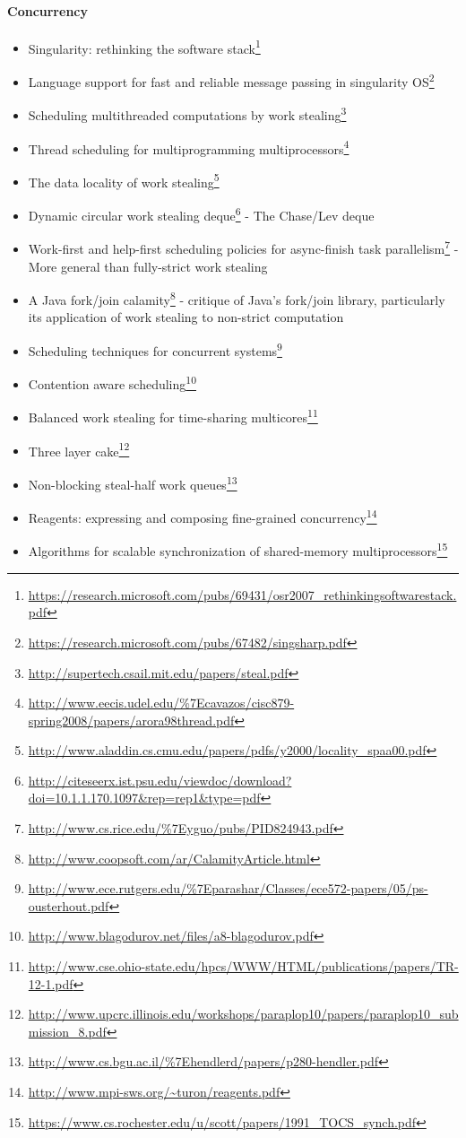 \documentclass[a4paper,]{book}
\renewcommand{\href}[2]{#2\footnote{\url{#1}}}
\begin{document}
\paragraph{Concurrency}\label{concurrency}

\begin{itemize}
\itemsep1pt\parskip0pt
\item
  \href{https://research.microsoft.com/pubs/69431/osr2007_rethinkingsoftwarestack.pdf}{Singularity:
  rethinking the software stack}
\item
  \href{https://research.microsoft.com/pubs/67482/singsharp.pdf}{Language
  support for fast and reliable message passing in singularity OS}
\item
  \href{http://supertech.csail.mit.edu/papers/steal.pdf}{Scheduling
  multithreaded computations by work stealing}
\item
  \href{http://www.eecis.udel.edu/\%7Ecavazos/cisc879-spring2008/papers/arora98thread.pdf}{Thread
  scheduling for multiprogramming multiprocessors}
\item
  \href{http://www.aladdin.cs.cmu.edu/papers/pdfs/y2000/locality_spaa00.pdf}{The
  data locality of work stealing}
\item
  \href{http://citeseerx.ist.psu.edu/viewdoc/download?doi=10.1.1.170.1097\&rep=rep1\&type=pdf}{Dynamic
  circular work stealing deque} - The Chase/Lev deque
\item
  \href{http://www.cs.rice.edu/\%7Eyguo/pubs/PID824943.pdf}{Work-first
  and help-first scheduling policies for async-finish task parallelism}
  - More general than fully-strict work stealing
\item
  \href{http://www.coopsoft.com/ar/CalamityArticle.html}{A Java
  fork/join calamity} - critique of Java's fork/join library,
  particularly its application of work stealing to non-strict
  computation
\item
  \href{http://www.ece.rutgers.edu/\%7Eparashar/Classes/ece572-papers/05/ps-ousterhout.pdf}{Scheduling
  techniques for concurrent systems}
\item
  \href{http://www.blagodurov.net/files/a8-blagodurov.pdf}{Contention
  aware scheduling}
\item
  \href{http://www.cse.ohio-state.edu/hpcs/WWW/HTML/publications/papers/TR-12-1.pdf}{Balanced
  work stealing for time-sharing multicores}
\item
  \href{http://www.upcrc.illinois.edu/workshops/paraplop10/papers/paraplop10_submission_8.pdf}{Three
  layer cake}
\item
  \href{http://www.cs.bgu.ac.il/\%7Ehendlerd/papers/p280-hendler.pdf}{Non-blocking
  steal-half work queues}
\item
  \href{http://www.mpi-sws.org/~turon/reagents.pdf}{Reagents: expressing
  and composing fine-grained concurrency}
\item
  \href{https://www.cs.rochester.edu/u/scott/papers/1991_TOCS_synch.pdf}{Algorithms
  for scalable synchronization of shared-memory multiprocessors}
\end{itemize}
\end{document}
